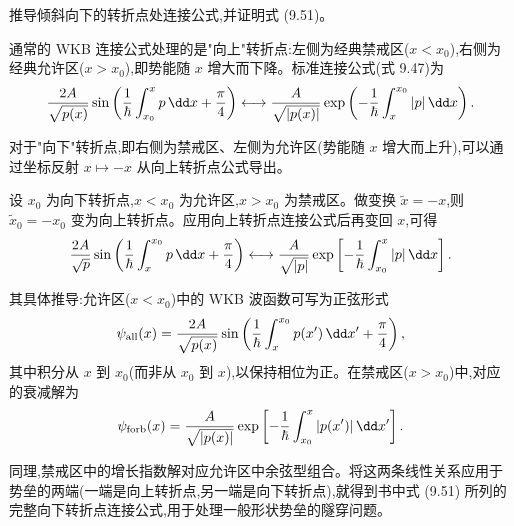 \begin{question}
推导倾斜向下的转折点处连接公式,并证明式 (9.51)。

\par\smallskip
{}

\end{question}
\begin{solution}
通常的 WKB 连接公式处理的是"向上"转折点:左侧为经典禁戒区($x<x_0$),右侧为经典允许区($x>x_0$),即势能随 $x$ 增大而下降。标准连接公式(式 9.47)为
\[
{2A\over\sqrt{p(x)}}\sin\left({1\over\hbar}\int_{x_0}^{x}p\,\dd x+{\pi\over4}\right)
\longleftrightarrow
{A\over\sqrt{|p(x)|}}\exp\left(-{1\over\hbar}\int_{x}^{x_0}|p|\,\dd x\right).
\]

对于"向下"转折点,即右侧为禁戒区、左侧为允许区(势能随 $x$ 增大而上升),可以通过坐标反射 $x\mapsto -x$ 从向上转折点公式导出。

设 $x_0$ 为向下转折点,$x<x_0$ 为允许区,$x>x_0$ 为禁戒区。做变换 $\tilde x=-x$,则 $\tilde x_0=-x_0$ 变为向上转折点。应用向上转折点连接公式后再变回 $x$,可得
\[
{2A\over\sqrt p}\sin\left({1\over\hbar}\int_x^{x_0}p\,\dd x+{\pi\over4}\right)
\longleftrightarrow
{A\over\sqrt{|p|}}\exp\left[-{1\over\hbar}\int_{x_0}^{x}|p|\,\dd x\right].
\]

其具体推导:允许区($x<x_0$)中的 WKB 波函数可写为正弦形式
\[
\psi_{\text{all}}(x)={2A\over\sqrt{p(x)}}\sin\left({1\over\hbar}\int_x^{x_0}p(x')\,\dd x'+{\pi\over4}\right),
\]
其中积分从 $x$ 到 $x_0$(而非从 $x_0$ 到 $x$),以保持相位为正。在禁戒区($x>x_0$)中,对应的衰减解为
\[
\psi_{\text{forb}}(x)={A\over\sqrt{|p(x)|}}\exp\left[-{1\over\hbar}\int_{x_0}^{x}|p(x')|\,\dd x'\right].
\]

同理,禁戒区中的增长指数解对应允许区中余弦型组合。将这两条线性关系应用于势垒的两端(一端是向上转折点,另一端是向下转折点),就得到书中式 (9.51) 所列的完整向下转折点连接公式,用于处理一般形状势垒的隧穿问题。
\end{solution}

